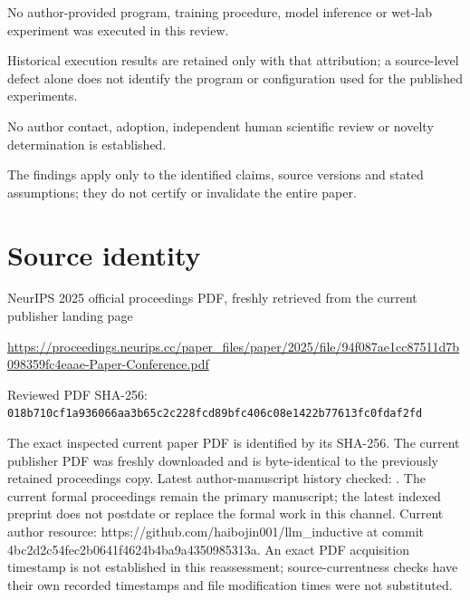 \documentclass[11pt]{article}
\begin{document}
No author-provided program, training procedure, model inference or wet-lab experiment was executed in this review.\par

Historical execution results are retained only with that attribution; a source-level defect alone does not identify the program or configuration used for the published experiments.\par

No author contact, adoption, independent human scientific review or novelty determination is established.\par

The findings apply only to the identified claims, source versions and stated assumptions; they do not certify or invalidate the entire paper.\par

\section*{Source identity}

NeurIPS 2025 official proceedings PDF, freshly retrieved from the current publisher landing page

\url{https://proceedings.neurips.cc/paper_files/paper/2025/file/94f087ae1cc87511d7b098359fc4eaae-Paper-Conference.pdf}

Reviewed PDF SHA-256: \nolinkurl{018b710cf1a936066aa3b65c2c228fcd89bfc406c08e1422b77613fc0fdaf2fd}

The exact inspected current paper PDF is identified by its SHA-256. The current publisher PDF was freshly downloaded and is byte-identical to the previously retained proceedings copy. Latest author-manuscript history checked: . The current formal proceedings remain the primary manuscript; the latest indexed preprint does not postdate or replace the formal work in this channel. Current author resource: https://github.com/haibojin001/llm\_inductive at commit 4bc2d2c54fec2b0641f4624b4ba9a4350985313a.  An exact PDF acquisition timestamp is not established in this reassessment; source-currentness checks have their own recorded timestamps and file modification times were not substituted.
\end{document}
